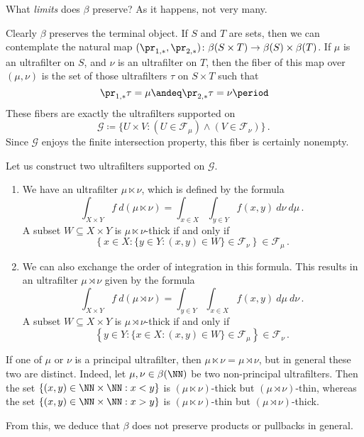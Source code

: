 \begin{nul}
	What \emph{limits} does $ \beta $ preserve?
	As it happens, not very many.

	Clearly $ \beta $ preserves the terminal object.
	If $ S $ and $ T $ are sets, then
	we can contemplate the natural map
	$ (\pr_{1,\ast},\pr_{2,\ast}) \colon
	\beta(S \times T) \to \beta(S) \times \beta(T) $.
	If $ \mu $ is an ultrafilter on $ S $,
	and $ \nu $ is an ultrafilter on $ T $,
	then the fiber of this map over $ (\mu,\nu) $
	is the set of those ultrafilters $ \tau $
	on $ S \times T $ such that
	\[
		\pr_{1,\ast}\tau = \mu \andeq
		\pr_{2,\ast}\tau = \nu \period
	\]
	These fibers are exactly the ultrafilters supported on
	\[
		\mathscr{G} \coloneq
			\{ U \times V :
			(U \in \mathscr{F}_{\mu})
			\wedge (V \in \mathscr{F}_{\nu}) \} \period
	\]
	Since $ \mathscr{G} $ enjoys the finite intersection property,
	this fiber is certainly nonempty.

	Let us construct two ultrafilters supported on $ \mathscr{G} $.
	\begin{enumerate}
		\item We have an ultrafilter $ \mu \ltimes \nu $,
			which is defined by the formula
			\[
			\int_{X \times Y} f\ d(\mu \ltimes \nu) =
			\int_{x \in X} \int_{y \in Y}
			f(x, y)\ d\nu\ d\mu \period
			\]
			A subset $ W \subseteq X \times Y $ is
			$ \mu \ltimes \nu $-thick if and only if 
			\[
			\left\{ x \in X :
			\{ y \in Y : (x,y) \in W \}
			\in \mathscr{F}_{\nu} \right\}
			\in \mathscr{F}_{\mu} \period
			\]
		\item We can also exchange the order 
			of integration in this formula.
			This results in an ultrafilter
			$ \mu \rtimes \nu $ given by
			the formula
			\[
			\int_{X \times Y} f\ d(\mu \rtimes \nu) =
			\int_{y \in Y} \int_{x \in X}
			f(x, y)\ d\mu\ d\nu \period
			\]
			A subset $ W \subseteq X \times Y $ is
			$ \mu \rtimes \nu $-thick if and only if 
			\[
			\left\{ y \in Y :
			\{ x \in X : (x,y) \in W \}
			\in \mathscr{F}_{\mu} \right\}
			\in \mathscr{F}_{\nu} \period
			\]
	\end{enumerate}
	
	If one of $ \mu $ or $ \nu $ is a principal ultrafilter,
	then $ \mu \ltimes \nu = \mu \rtimes \nu $,
	but in general these two are distinct.
	Indeed, let $ \mu, \nu \in \beta(\NN) $ be
	two non-principal ultrafilters.
	Then the set $ \{ (x,y) \in \NN \times \NN : x < y \} $
	is $ (\mu \ltimes \nu) $-thick but $ (\mu \rtimes \nu) $-thin,
	whereas the set $ \{ (x,y) \in \NN \times \NN : x > y \} $
	is $ (\mu \ltimes \nu) $-thin but $ (\mu \rtimes \nu) $-thick.

	From this, we deduce that $ \beta $ does not preserve
	products or pullbacks in general.
\end{nul}

